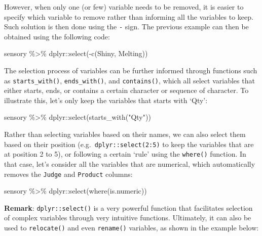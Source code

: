 \documentclass[
]{book}
\newenvironment{Shaded}{\begin{snugshade}}{\end{snugshade}}
\newcommand{\FunctionTok}[1]{\textcolor[rgb]{0.00,0.00,0.00}{#1}}
\newcommand{\NormalTok}[1]{#1}
\newcommand{\SpecialCharTok}[1]{\textcolor[rgb]{0.00,0.00,0.00}{#1}}
\newcommand{\StringTok}[1]{\textcolor[rgb]{0.31,0.60,0.02}{#1}}
\begin{document}
However, when only one (or few) variable needs to be removed, it is easier to specify which variable to remove rather than informing all the variables to keep. Such solution is then done using the \texttt{-} sign. The previous example can then be obtained using the following code:

\begin{Shaded}
\begin{Highlighting}[]
\NormalTok{sensory }\SpecialCharTok{\%\textgreater{}\%} 
\NormalTok{  dplyr}\SpecialCharTok{::}\FunctionTok{select}\NormalTok{(}\SpecialCharTok{{-}}\FunctionTok{c}\NormalTok{(Shiny, Melting))}
\end{Highlighting}
\end{Shaded}

The selection process of variables can be further informed through functions such as \texttt{starts\_with()}, \texttt{ends\_with()}, and \texttt{contains()}, which all select variables that either starts, ends, or contains a certain character or sequence of character. To illustrate this, let's only keep the variables that starts with `Qty':

\begin{Shaded}
\begin{Highlighting}[]
\NormalTok{sensory }\SpecialCharTok{\%\textgreater{}\%} 
\NormalTok{  dplyr}\SpecialCharTok{::}\FunctionTok{select}\NormalTok{(}\FunctionTok{starts\_with}\NormalTok{(}\StringTok{"Qty"}\NormalTok{))}
\end{Highlighting}
\end{Shaded}

Rather than selecting variables based on their names, we can also select them based on their position (e.g.~\texttt{dplyr::select(2:5)} to keep the variables that are at position 2 to 5), or following a certain `rule' using the \texttt{where()} function. In that case, let's consider all the variables that are numerical, which automatically removes the \texttt{Judge} and \texttt{Product} columns:

\begin{Shaded}
\begin{Highlighting}[]
\NormalTok{sensory }\SpecialCharTok{\%\textgreater{}\%} 
\NormalTok{  dplyr}\SpecialCharTok{::}\FunctionTok{select}\NormalTok{(}\FunctionTok{where}\NormalTok{(is.numeric))}
\end{Highlighting}
\end{Shaded}

\textbf{Remark}: \texttt{dplyr::select()} is a very powerful function that facilitates selection of complex variables through very intuitive functions. Ultimately, it can also be used to \texttt{relocate()} and even \texttt{rename()} variables, as shown in the example below:
\end{document}
